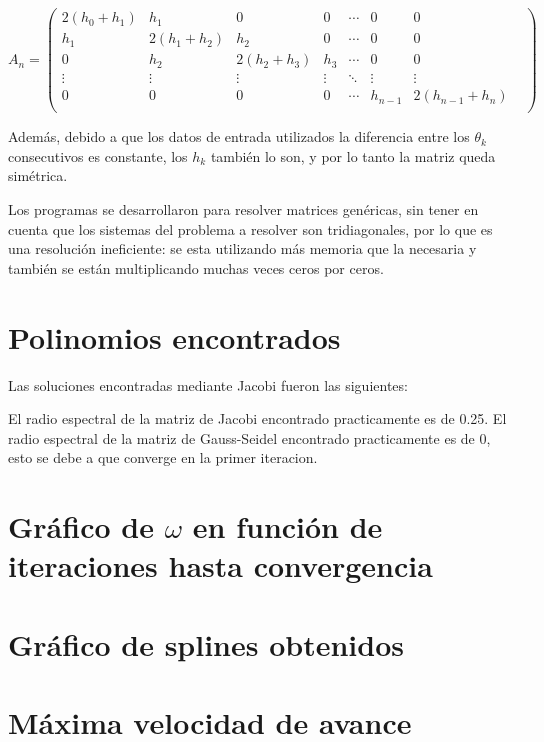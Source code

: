 \documentclass[12pt,spanish]{article}
\begin{document}
\[
A_n=
  \begin{pmatrix}
   2(h_0+h_1) & h_1 & 0 &  0 & \cdots & 0 & 0 &\\
   h_1 & 2(h_1+h_2) & h_2 & 0 &  \cdots & 0 & 0 &\\
   0 & h_2 & 2(h_2+h_3) & h_3  &  \cdots & 0 & 0 &\\
   \vdots  & \vdots & \vdots & \vdots & \ddots & \vdots & \vdots &\\
   0 & 0 & 0 & 0 & \cdots & h_{n-1} & 2(h_{n-1}+h_n)\\
  \end{pmatrix}
\]

Además, debido a que los datos de entrada utilizados la diferencia entre los $\theta _k$ consecutivos es constante, los $h_k$ también lo son, y por lo tanto la matriz queda simétrica.

Los programas se desarrollaron para resolver matrices genéricas, sin tener en cuenta que los sistemas del problema a resolver son tridiagonales, por lo que es una resolución ineficiente: se esta utilizando más memoria que la necesaria y también se están multiplicando muchas veces ceros por ceros.

\section*{Polinomios encontrados}
Las soluciones encontradas mediante Jacobi fueron las siguientes:

El radio espectral de la matriz de Jacobi encontrado practicamente es de 0.25.
El radio espectral de la matriz de Gauss-Seidel encontrado practicamente es de 0, esto se debe a que converge en la primer iteracion.
\section*{Gráfico de $\omega$ en función de iteraciones hasta convergencia}
\section*{Gráfico de splines obtenidos}
\section*{Máxima velocidad de avance}
\end{document}
